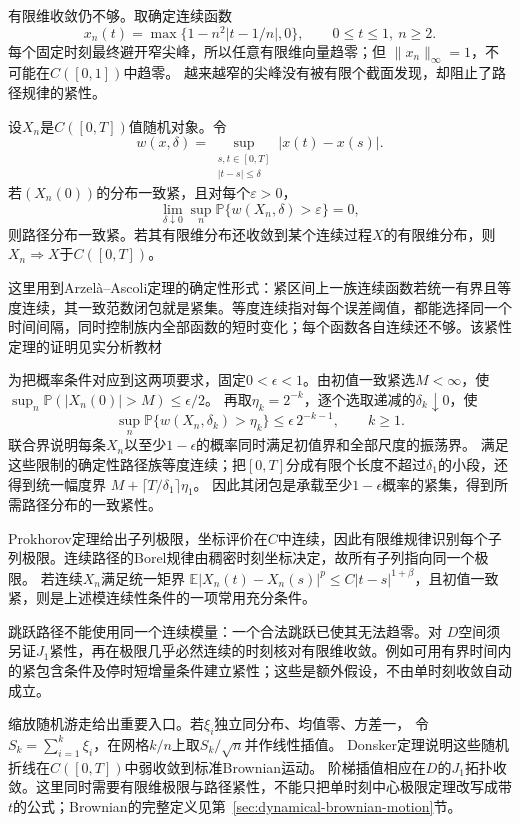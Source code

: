 有限维收敛仍不够。取确定连续函数
\[
x_n(t)=\max\{1-n^2|t-1/n|,0\},\qquad 0\leq t\leq1,\ n\geq2.
\]
每个固定时刻最终避开窄尖峰，所以任意有限维向量趋零；但
\(\|x_n\|_\infty=1\)，不可能在\(C([0,1])\)中趋零。
越来越窄的尖峰没有被有限个截面发现，却阻止了路径规律的紧性。

\begin{theorem}[连续路径的紧性与极限识别]
\label{thm:rv-continuous-path-tightness}
设\(X_n\)是\(C([0,T])\)值随机对象。令
\[
w(x,\delta)=\sup_{\substack{s,t\in[0,T]\\|t-s|\leq\delta}}|x(t)-x(s)|.
\]
若\((X_n(0))\)的分布一致紧，且对每个\(\varepsilon>0\)，
\[
\lim_{\delta\downarrow0}\sup_n
\mathbb P\{w(X_n,\delta)>\varepsilon\}=0,
\]
则路径分布一致紧。若其有限维分布还收敛到某个连续过程\(X\)的有限维分布，则
\(X_n\Rightarrow X\)于\(C([0,T])\)。
\end{theorem}
这里用到Arzelà--Ascoli定理的确定性形式：紧区间上一族连续函数若统一有界且等度连续，其一致范数闭包就是紧集。等度连续指对每个误差阈值，都能选择同一个时间间隔，同时控制族内全部函数的短时变化；每个函数各自连续还不够。该紧性定理的证明见实分析教材

为把概率条件对应到这两项要求，固定\(0<\epsilon<1\)。由初值一致紧选\(M<\infty\)，使
\(\sup_n\mathbb P(|X_n(0)|>M)\leq\epsilon/2\)。
再取\(\eta_k=2^{-k}\)，逐个选取递减的\(\delta_k\downarrow0\)，使
\[
 \sup_n\mathbb P\{w(X_n,\delta_k)>\eta_k\}
 \leq\epsilon\,2^{-k-1},\qquad k\geq1.
\]
联合界说明每条\(X_n\)以至少\(1-\epsilon\)的概率同时满足初值界和全部尺度的振荡界。
满足这些限制的确定性路径族等度连续；把\([0,T]\)分成有限个长度不超过\(\delta_1\)的小段，还得到统一幅度界
\(M+\lceil T/\delta_1\rceil\eta_1\)。
因此其闭包是承载至少\(1-\epsilon\)概率的紧集，得到所需路径分布的一致紧性。

Prokhorov定理给出子列极限，坐标评价在\(C\)中连续，因此有限维规律识别每个子列极限。连续路径的Borel规律由稠密时刻坐标决定，故所有子列指向同一个极限。
若连续\(X_n\)满足统一矩界
\(\mathbb E|X_n(t)-X_n(s)|^p\leq C|t-s|^{1+\beta}\)，且初值一致紧，则是上述模连续性条件的一项常用充分条件。

跳跃路径不能使用同一个连续模量：一个合法跳跃已使其无法趋零。对
\(D\)空间须另证\(J_1\)紧性，再在极限几乎必然连续的时刻核对有限维收敛。例如可用有界时间内的紧包含条件及停时短增量条件建立紧性；这些是额外假设，不由单时刻收敛自动成立。

缩放随机游走给出重要入口。若\(\xi_i\)独立同分布、均值零、方差一，
令\(S_k=\sum_{i=1}^k\xi_i\)，在网格\(k/n\)上取\(S_k/\sqrt n\)并作线性插值。
Donsker定理说明这些随机折线在\(C([0,T])\)中弱收敛到标准Brownian运动。
阶梯插值相应在\(D\)的\(J_1\)拓扑收敛。这里同时需要有限维极限与路径紧性，不能只把单时刻中心极限定理改写成带\(t\)的公式；Brownian的完整定义见第~\ref{sec:dynamical-brownian-motion}节。

